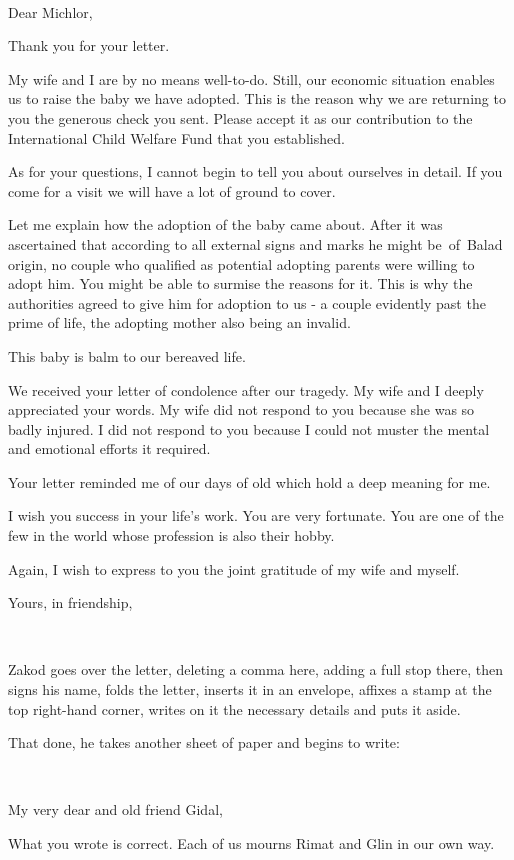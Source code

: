 \documentclass[letterpaper]{article}
\begin{document}
~

Dear Michlor,

Thank you for your letter. 

My wife and I are by no means well-to-do. Still, our economic situation enables us to raise the baby we have adopted.
This is the reason why we are returning to you the generous check you sent. Please accept it as our contribution to the
International Child Welfare Fund that you established.

As for your questions, I cannot begin to tell you about ourselves in detail. If you come for a visit we will have a lot
of ground to cover.

Let me explain how the adoption of the baby came about. After it was ascertained that according to all external signs
and marks he might be~of~Balad origin, no couple who qualified as potential adopting parents were willing to adopt him.
You might be able to surmise the reasons for it. This is why the authorities agreed to give him for adoption to us - a
couple evidently past the prime of life, the adopting mother also being an invalid.

This baby is balm to our bereaved life.

We received your letter of condolence after our tragedy. My wife and I deeply appreciated your words. My wife did not
respond to you because she was so badly injured. I did not respond to you because I could not muster the mental and
emotional efforts it required.

Your letter reminded me of our days of old which hold a deep meaning for me.

I wish you success in your life's work. You are very fortunate. You are one of the few in the world whose profession is
also their hobby.

Again, I wish to express to you the joint gratitude of my wife and myself.

Yours, in friendship,

~

Zakod goes over the letter, deleting a comma here, adding a full stop there, then signs his name, folds the letter,
inserts it in an envelope, affixes a stamp at the top right-hand corner, writes on it the necessary details and puts it
aside.

That done, he takes another sheet of paper and begins to write:

~

My very dear and old friend Gidal,

What you wrote is correct. Each of us mourns Rimat and Glin in our own way.
\end{document}
